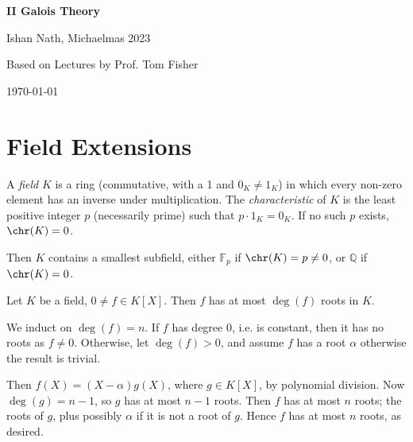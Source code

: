 \documentclass[12pt]{article}
\begin{document}
\hypersetup{pageanchor=false}
\begin{titlepage}
	\begin{center}
		\vspace*{1em}
		\Huge
		\textbf{II Galois Theory}

		\vspace{1em}
		\large
		Ishan Nath, Michaelmas 2023

		\vspace{1.5em}

		\Large

		Based on Lectures by Prof. Tom Fisher

		\vspace{1em}

		\large
		\today
	\end{center}
	
\end{titlepage}
\hypersetup{pageanchor=true}

\tableofcontents

\newpage


\section{Field Extensions}
\label{sec:field_ext}

A \emph{field} $K$ is a ring (commutative, with a 1 and $0_K \neq 1_K$) in which every non-zero element has an inverse under multiplication. The \emph{characteristic} of $K$ is the least positive integer $p$ (necessarily prime) such that $p \cdot 1_K = 0_K$. If no such $p$ exists, $\chr(K) = 0$.

Then $K$ contains a smallest subfield, either $\mathbb{F}_p$ if $\chr(K) = p \neq 0$, or $\mathbb{Q}$ if $\chr(K) = 0$.

\begin{lemma}\label{lemma:1.1}
	Let $K$ be a field, $0 \neq f \in K[X]$. Then $f$ has at most $\deg(f)$ roots in $K$.
\end{lemma}

\begin{proofbox}
	We induct on $\deg(f) = n$. If $f$ has degree 0, i.e. is constant, then it has no roots as $f \neq 0$. Otherwise, let $\deg(f) > 0$, and assume $f$ has a root $\alpha$ otherwise the result is trivial.

	Then $f(X) = (X - \alpha)g(X)$, where $g \in K[X]$, by polynomial division. Now $\deg(g) = n-1$, so $g$ has at most $n-1$ roots. Then $f$ has at most $n$ roots; the roots of $g$, plus possibly $\alpha$ if it is not a root of $g$. Hence $f$ has at most $n$ roots, as desired.
\end{proofbox}
\end{document}
